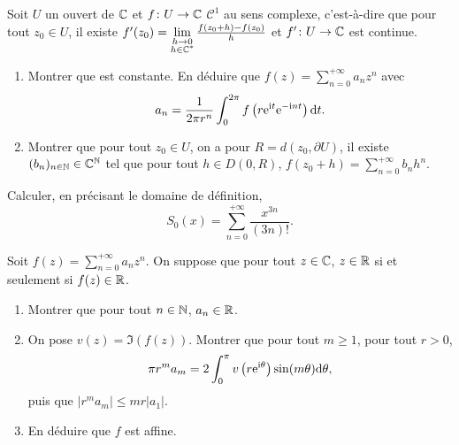 \documentclass[12pt]{article}
\begin{document}
\begin{exercise}
    Soit $U$ un ouvert de $\mathbb{C}$ et $f\colon U\to\mathbb{C}$ $\mathcal{C}^{1}$ au sens complexe, c'est-à-dire que pour tout $z_{0}\in U$, il existe $f'(z_{0})=\lim\limits_{\substack{h\to0\\ h\in\mathbb{C}^{*}}}\frac{f(z_{0}+h)-f(z_{0})}{h}$ et $f'\colon U\to\mathbb{C}$ est continue.
    \begin{enumerate}
        \item Montrer que 
            est constante. En déduire que $f(z)=\sum_{n=0}^{+\infty}a_nz^{n}$ avec 
            \begin{equation}
                a_n=\frac{1}{2\pi r^{n}}\int_{0}^{2\pi}f\left(r\mathrm{e}^{\mathrm{i} t}\mathrm{e}^{-\mathrm{i} nt}\right)\mathrm{d} t.
            \end{equation}
            \item Montrer que pour tout $z_{0}\in U$, on a pour $R=d(z_{0},\partial U)$, il existe $(b_n)_{n\in\mathbb{N}}\in\mathbb{C}^{\mathbb{N}}$ tel que pour tout $h\in D(0,R)$, $f(z_{0}+h)=\sum_{n=0}^{+\infty}b_n h^{n}$.
    \end{enumerate}
\end{exercise}

\begin{exercise}
    Calculer, en précisant le domaine de définition,
    \begin{equation}
        S_0(x)=\sum_{n=0}^{+\infty}\frac{x^{3n}}{(3n)!}.
    \end{equation}
\end{exercise}

\begin{exercise}
    Soit $f(z)=\sum_{n=0}^{+\infty}a_nz^{n}$. On suppose que pour tout $z\in\mathbb{C}$, $z\in\mathbb{R}$ si et seulement si $f(z)\in\mathbb{R}$.
    \begin{enumerate}
        \item Montrer que pour tout $n\in\mathbb{N}$, $a_n\in\mathbb{R}$.
        \item On pose $v(z)=\Im(f(z))$. Montrer que pour tout $m\geqslant1$, pour tout $r>0$,
        \begin{equation}
            \pi r^{m}a_m=2\int_{0}^{\pi}v\left(r\mathrm{e}^{\mathrm{i}\theta}\right)\sin(m\theta)\mathrm{d}\theta,
        \end{equation}
        puis que $\left\lvert r^{m}a_m\right\rvert\leqslant mr\left\lvert a_1\right\rvert$.
        \item En déduire que $f$ est affine.
    \end{enumerate}
\end{exercise}
\end{document}
